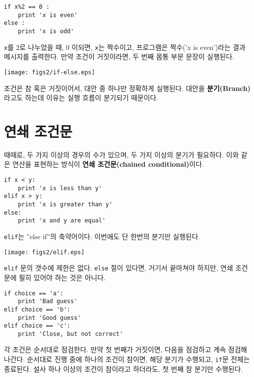 \beforeverb
\begin{verbatim}
if x%2 == 0 :
    print 'x is even'
else :
    print 'x is odd'
\end{verbatim}
\afterverb
%
{\tt x}를 2로 나누었을 때, 0 이되면, {\tt x}는 짝수이고, 프로그램은 짝수('x is even')라는 결과 메시지를 출력한다. 
만약 조건이 거짓이라면, 두 번째 몸통 부문 문장이 실행된다.

\beforefig
\centerline{\texttt{[image: figs2/if-else.eps]}}
\afterfig

조건은 참 혹은 거짓이어서, 대안 중 하나만 정확하게 실행된다. 
대안을 {\bf 분기(Branch)}라고도 하는데 이유는 실행 흐름이 분기되기 때문이다.


\section{연쇄 조건문}

때때로, 두 가지 이상의 경우의 수가 있으며, 두 가지 이상의 분기가 필요하다.
이와 같은 연산을 표현하는 방식이 {\bf 연쇄 조건문(chained conditional)}이다.

\beforeverb
\begin{verbatim}
if x < y:
    print 'x is less than y'
elif x > y:
    print 'x is greater than y'
else:
    print 'x and y are equal'
\end{verbatim}
\afterverb
%
{\tt elif}는 ''else if''의 축약어이다. 이번에도 단 한번의 분기만 실행된다.

\beforefig
\centerline{\texttt{[image: figs2/elif.eps]}}
\afterfig

{\tt elif} 문의 갯수에 제한은 없다. 
{\tt else} 절이 있다면, 거기서 끝마쳐야 하지만, 연쇄 조건문에 필히 있어야 하는 것은 아니다.


\beforeverb
\begin{verbatim}
if choice == 'a':
    print 'Bad guess'
elif choice == 'b':
    print 'Good guess'
elif choice == 'c':
    print 'Close, but not correct'
\end{verbatim}
\afterverb
%
각 조건은 순서대로 점검한다. 만약 첫 번째가 거짓이면, 다음을 점검하고 계속 점검해 나간다.
순서대로 진행 중에 하나의 조건이 참이면, 해당 분기가 수행되고, {\tt if}문 전체는 종료된다. 
설사 하나 이상의 조건이 참이라고 하더라도, 첫 번째 참 분기만 수행된다.

